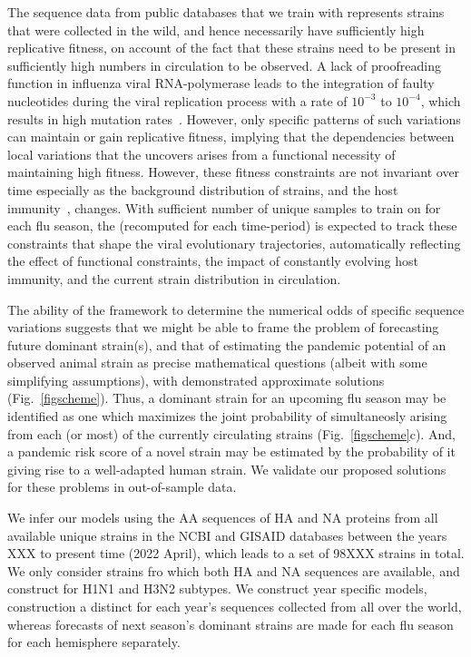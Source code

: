 \documentclass[onecolumn, compsoc,10pt]{IEEEtran}
\begin{document}
The sequence data from public databases that we train  with represents strains that were collected in the wild, and hence necessarily have  sufficiently high replicative fitness, on account of the fact that  these strains need  to be present in sufficiently high numbers in circulation to be  observed. A lack of proofreading function in influenza viral RNA-polymerase leads to the integration of faulty nucleotides during the viral replication process with a rate of $10^{-3}$ to $10^{-4}$, which results in high mutation rates~\cite{ahlquist2002rna,chen2006avian}. However, only specific patterns of such variations can maintain or gain replicative fitness, implying that  the  dependencies between local variations that the \enet uncovers arises from a  functional necessity of maintaining high  fitness. However, these fitness constraints are not invariant over time especially as the background distribution of strains, and the host immunity~\cite{woolthuis2016long,fan2012role,van2016differential,berkhoff2007assessment,van2012evasion}, changes. With sufficient number of unique samples to train on for each flu season, the \enet (recomputed for each time-period) is expected to  track these constraints that shape the viral evolutionary trajectories, automatically reflecting the effect of  functional constraints, the impact of constantly evolving host immunity, and the current strain distribution in circulation.  

The ability of the \enet framework to determine the numerical odds of specific sequence variations suggests that we might be able to frame the problem of forecasting future dominant strain(s), and that of estimating the  pandemic potential of an observed animal strain as precise mathematical questions (albeit with some simplifying assumptions), with demonstrated approximate solutions (Fig.~\ref{figscheme}). Thus,  a dominant strain for an upcoming flu season
may be identified as one which maximizes the joint probability of simultaneosly arising from each (or most)  of the currently circulating strains (Fig.~\ref{figscheme}c).
And, a pandemic risk score of a novel strain may be estimated by the probability of it giving rise to a well-adapted human strain.  We validate  our proposed solutions for these problems in out-of-sample data.


We infer our models using the AA sequences of HA and NA proteins from all available unique \infl strains in the NCBI and GISAID databases between the years XXX to present time (2022 April), which leads to a set of 98XXX strains in total. We only consider strains fro which both HA and NA sequences are available, and construct \enet for H1N1 and H3N2 subtypes. We construct year specific models, construction a distinct \enet for each year's sequences collected from all over the world, whereas forecasts of next season's dominant strains are made for each flu season for each hemisphere separately.
\end{document}
